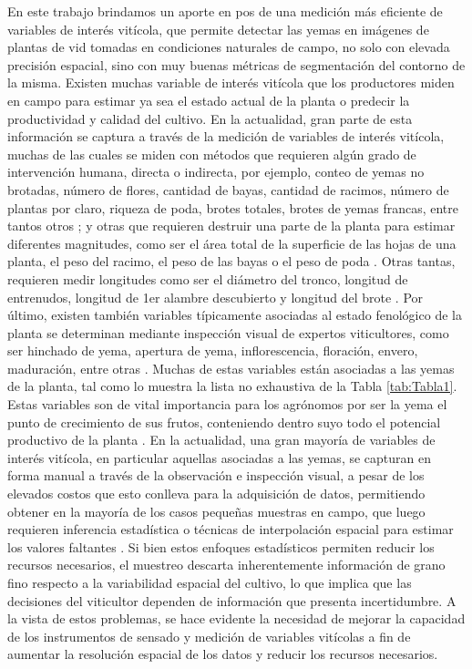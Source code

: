 \documentclass[a4paper,authoryear,review]{elsarticle}
\begin{document}
En este trabajo brindamos un aporte en pos de una medición más eficiente de variables de interés vitícola, que permite detectar las yemas en imágenes de plantas de vid tomadas en condiciones naturales de campo, no solo con elevada precisión espacial, sino con muy buenas métricas de segmentación del contorno de la misma.
%
Existen muchas variable de interés vitícola que los productores miden en campo para estimar ya sea el estado actual de la planta o predecir la productividad y calidad del cultivo. En la actualidad, gran parte de esta información se captura a través de la medición de variables de interés vitícola, muchas de las cuales se miden con métodos que requieren algún grado de intervención humana, directa o indirecta, por ejemplo,  conteo de yemas no brotadas, número de flores, cantidad de bayas, cantidad de racimos, número de plantas por claro, riqueza de poda, brotes totales, brotes de yemas francas, entre tantos otros \citep{matese2015technology, ozdemir2017precision, poni2018grapevine}; y otras que requieren destruir una parte de la planta para estimar diferentes magnitudes, como ser el área total de la superficie de las hojas de una planta, el peso del racimo, el peso de las bayas o el peso de poda \citep{kliewer2005leaf, diago2012grapevine, liu2013towards}. Otras tantas, requieren medir longitudes como ser el diámetro del tronco, longitud de entrenudos, longitud de 1er alambre descubierto y longitud del brote \citep{pellegrino2005towards, intrigliolo2007evaluation, reynolds2009influence}. Por último, existen también variables típicamente asociadas al estado fenológico de la planta se determinan mediante inspección visual de expertos viticultores, como ser hinchado de yema, apertura de yema, inflorescencia, floración, envero, maduración, entre otras \citep{lorenz1995growth, zapata2017predicting}.
%
Muchas de estas variables están asociadas a las yemas de la planta, tal como lo muestra la lista no exhaustiva de la Tabla \ref{tab:Tabla1}. Estas variables son de vital importancia para los agrónomos por ser la yema el punto de crecimiento de sus frutos, conteniendo dentro suyo todo el potencial productivo de la planta \citep{may2000bud, vasconcelos2009flowering, keller2020science}.
%
En la actualidad, una gran mayoría de variables de interés vitícola, en particular aquellas asociadas a las yemas, se capturan en forma manual a través de la  observación e inspección visual, a pesar de los elevados costos que esto conlleva para la adquisición de datos, permitiendo obtener en la mayoría de los casos pequeñas muestras en campo, que luego requieren inferencia estadística o técnicas de interpolación espacial para estimar los valores faltantes \citep{whelan1996spatial, borgogno2018comparison, taylor2019considerations}. Si bien estos enfoques estadísticos permiten reducir los recursos necesarios, el muestreo descarta inherentemente información de grano fino respecto a la variabilidad espacial del cultivo, lo que implica que las decisiones del viticultor dependen de información que presenta incertidumbre. A la vista de estos problemas, se hace evidente la necesidad de mejorar la capacidad de los instrumentos de sensado y medición de variables vitícolas a fin de aumentar la resolución espacial de los datos y reducir los recursos necesarios.  
\end{document}
